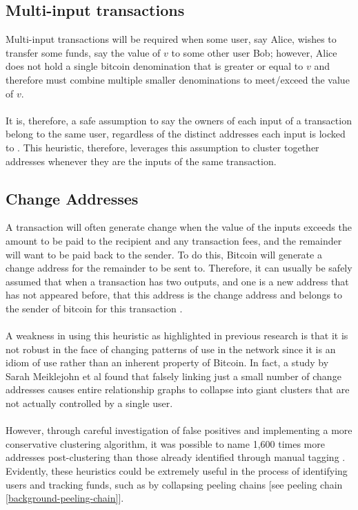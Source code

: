 \subsection{Multi-input transactions}\label{background:multi-input-tx}
Multi-input transactions will be required when some user, say Alice, wishes to transfer some funds, say the value of $v$ to some other user Bob; however, Alice does not hold a single bitcoin denomination that is greater or equal to $v$ and therefore must combine multiple smaller denominations to meet/exceed the value of $v$. 
\\\\
It is, therefore, a safe assumption to say the owners of each input of a transaction belong to the same user, regardless of the distinct addresses each input is locked to \cite{RefWorks:doc:5c3de14be4b042abd3bcc2c6}. This heuristic, therefore, leverages this assumption to cluster together addresses whenever they are the inputs of the same transaction.

\subsection{Change Addresses}\label{background:cluster-change-address}
A transaction will often generate change when the value of the inputs exceeds the amount to be paid to the recipient and any transaction fees, and the remainder will want to be paid back to the sender. To do this, Bitcoin will generate a change address for the remainder to be sent to. Therefore, it can usually be safely assumed that when a transaction has two outputs, and one is a new address that has not appeared before, that this address is the change address and belongs to the sender of bitcoin for this transaction \cite{RefWorks:doc:5c3de14be4b042abd3bcc2c6}. 
\\\\
A weakness in using this heuristic as highlighted in previous research \cite{Refworks:doc:5c3de7e3e4b0ea6196452d80} is that it is not robust in the face of changing patterns of use in the network since it is an idiom of use rather than an inherent property of Bitcoin. In fact, a study by Sarah Meiklejohn et al \cite{Refworks:doc:5c3de7e3e4b0ea6196452d80} found that falsely linking just a small number of change addresses causes entire relationship graphs to collapse into giant clusters that are not actually controlled by a single user. 
\\\\
However, through careful investigation of false positives and implementing a more conservative clustering algorithm, it was possible to name 1,600 times more addresses post-clustering than those already identified through manual tagging \cite{Refworks:doc:5c3de7e3e4b0ea6196452d80}. Evidently, these heuristics could be extremely useful in the process of identifying users and tracking funds, such as by collapsing peeling chains [see peeling chain \ref{background-peeling-chain}].

